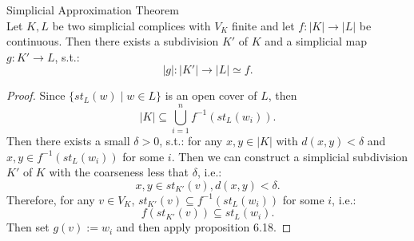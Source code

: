 \begin{theorem}{Simplicial Approximation Theorem}\\
Let $K,L$ be two simplicial complices with $V_K$ finite and let $f: |K| \rightarrow |L|$ be continuous. Then there exists a subdivision $K'$ of $K$ and a simplicial map $g : K' \rightarrow L$, s.t.:
$$|g| : |K'| \rightarrow |L| \simeq f.$$
\end{theorem}

\begin{proof}
    Since $\{ st_L(w) \mid w \in L \}$ is an open cover of $L$, then
    $$|K| \subseteq \bigcup_{i=1}^n f^{-1} (st_L(w_i)).$$
    Then there exists a small $\delta >0$, s.t.: for any $x,y \in |K|$ with $d(x,y) < \delta$ and $x,y \in f^{-1}(st_L(w_i))$ for some $i$. Then we can construct a simplicial subdivision $K'$ of $K$ with the coarseness less that $\delta$, i.e.:
    $$x,y \in st_{K'}(v),d(x,y) <\delta.$$
    Therefore, for any $v \in V_K$, $st_{K'}(v) \subseteq f^{-1} (st_L(w_i))$ for some $i$, i.e.:
    $$f(st_{K'} (v)) \subseteq st_L(w_i).$$
    Then set $g(v) := w_i$ and then apply proposition 6.18.
\end{proof}